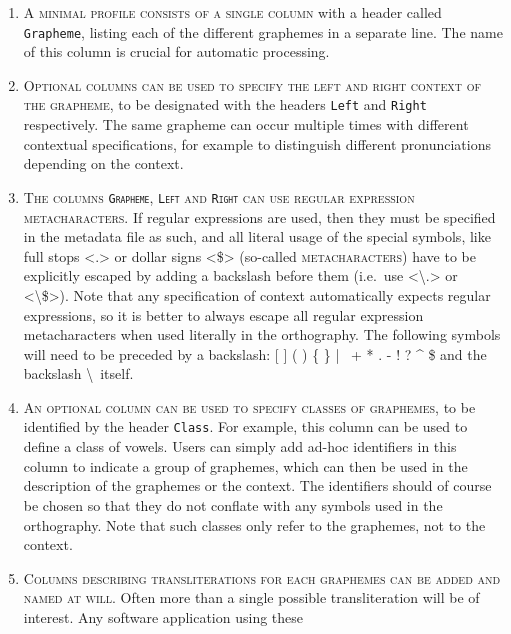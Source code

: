 \begin{enumerate}
	\def\labelenumi{A\arabic{enumi}.} \setcounter{enumi}{4} 
	\item \textsc{A minimal profile consists of a single column} with a header
       called \texttt{Grapheme}, listing each of the different graphemes in a
       separate line. The name of this column is crucial for automatic 
       processing.
	\item \textsc{Optional columns can be used to specify the left and right
       context of the grapheme}, to be designated with the headers \texttt{Left}
       and \texttt{Right} respectively. The same grapheme can occur multiple
       times with different contextual specifications, for example to
       distinguish different pronunciations depending on the context. 
	\item \textsc{The columns \texttt{Grapheme}, \texttt{Left} and \texttt{Right}
       can use regular expression \\ metacharacters.} If regular expressions are
       used, then they must be specified in the metadata file as such, 
	   and all literal usage of the special symbols, like full stops <.>
       or dollar signs <\$> (so-called \textsc{metacharacters}) have to be
       explicitly escaped by adding a backslash before them (i.e.~use
       <\textbackslash.> or <\textbackslash\$>). Note that any specification of
       context automatically expects regular expressions, so it is 
       better to always escape all regular expression metacharacters when used
       literally in the orthography. The following symbols will need to be
       preceded by a backslash: {[} {]} ( ) \{ \} | ~+ * . - ! ? \^{} \$ and the
       backslash \textbackslash~itself. 
	\item \textsc{An optional column can be used to specify classes of graphemes},
       to be identified by the header \texttt{Class}. For example, this column
       can be used to define a class of vowels. Users can simply add ad-hoc
       identifiers in this column to indicate a group of graphemes, which can
       then be used in the description of the graphemes or the context. The
       identifiers should of course be chosen so that they do not conflate
       with any symbols used in the orthography. Note that such
       classes only refer to the graphemes, not to the context. 
	\item \textsc{Columns describing transliterations for each graphemes can be
       added and named at will}. Often more than a single possible
       transliteration will be of interest. Any software application using these

\end{enumerate}
